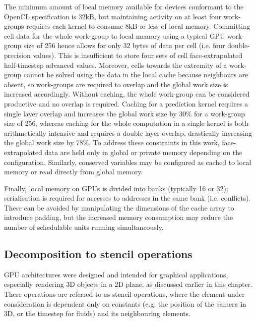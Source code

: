 The minimum amount of local memory available for devices conformant to the OpenCL specification is 32kB, but maintaining activity on at least four work-groups requires each kernel to consume 8kB or less of local memory. Committing cell data for the whole work-group to local memory using a typical GPU work-group size of 256 hence allows for only 32 bytes of data per cell (i.e. four double-precision values).  This is insufficient to store four sets of cell face-extrapolated half-timestep advanced values. Moreover, cells towards the extremity of a work-group cannot be solved using the data in the local cache because neighbours are absent, so work-groups are required to overlap and the global work size is increased accordingly. Without caching, the whole work-group can be considered productive and no overlap is required. Caching for a prediction kernel requires a single layer overlap and increases the global work size by 30\% for a work-group size of 256, whereas caching for the whole computation in a single kernel is both arithmetically intensive and requires a double layer overlap, drastically increasing the global work size by 78\%. To address these constraints in this work, face-extrapolated data are held only in global or private memory depending on the configuration. Similarly, conserved variables may be configured as cached to local memory or read directly from global memory.

Finally, local memory on GPUs is divided into banks (typically 16 or 32); serialisation is required for accesses to addresses in the same bank (i.e. conflicts). These can be avoided by manipulating the dimensions of the cache array to introduce padding, but the increased memory consumption may reduce the number of schedulable units running simultaneously.

\subsection{Decomposition to stencil operations}

GPU architectures were designed and intended for graphical applications, especially rendering 3D objects in a 2D plane, as discussed earlier in this chapter. These operations are referred to as stencil operations, where the element under consideration is dependent only on constants (e.g. the position of the camera in 3D, or the timestep for fluids) and its neighbouring elements.

